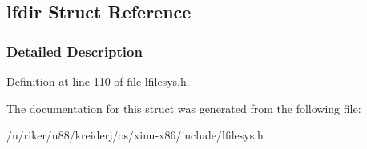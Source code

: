 \hypertarget{structlfdir}{}\subsection{lfdir Struct Reference}
\label{structlfdir}


\subsubsection{Detailed Description}


Definition at line 110 of file lfilesys.\+h.



The documentation for this struct was generated from the following file\+:\begin{DoxyCompactItemize}
\item 
/u/riker/u88/kreiderj/os/xinu-\/x86/include/lfilesys.\+h\end{DoxyCompactItemize}
